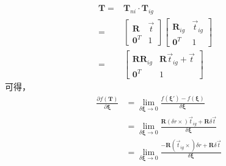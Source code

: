 \documentclass{article}
\begin{document}
\begin{equation}
	\begin{aligned}
		\boldsymbol{T}                          =          & \boldsymbol{T}_{ni} \cdot\boldsymbol{T}_{ig} 
		        &   \\=                                                   & 
		\left[                                                                   
		\begin{matrix} 
		\boldsymbol{R} & \vec{t}                                     \\ 
		\boldsymbol{0}^T  & 1                                                                        
		\end{matrix}
		\right]
		\left[ 
		\begin{matrix} 
		\boldsymbol{R}_{ig}                                 & \vec{t}_{ig}                                                             \\ 
		\boldsymbol{0}^T                                    & 1                                                                        
		\end{matrix}
		\right] &   \\=                                                   & 
		\left[                                                                   
		\begin{matrix} 
		\boldsymbol{R}\boldsymbol{R}_{ig} & \boldsymbol{R}\vec{t}_{ig}+\vec{t}                                     \\ 
		\boldsymbol{0}^T                                    & 1                                                                        
		\end{matrix}
		\right]
	\end{aligned}
\end{equation}
可得，
\begin{equation}
	\begin{aligned}
		\frac{\partial{f(\boldsymbol{T})}}{\partial{\boldsymbol{\xi}}} & = 
		\lim_{\delta\boldsymbol{\xi}\rightarrow0}\frac{f(\boldsymbol{\xi}')-  f(\boldsymbol{\xi})}{\delta\boldsymbol{\xi}}\\&=
		\lim_{\delta\boldsymbol{\xi}\rightarrow0}\frac{\boldsymbol{R}(\delta{r}\times)\vec{t}_{ig}+\boldsymbol{R}\delta \vec{t}}{\delta\boldsymbol{\xi}}\\&=
		\lim_{\delta\boldsymbol{\xi}\rightarrow0}\frac{-\boldsymbol{R}(\vec{t}_{ig}\times)\delta{r}+\boldsymbol{R}\delta \vec{t}}{\delta\boldsymbol{\xi}}
	\end{aligned}
\end{equation}
\end{document}
